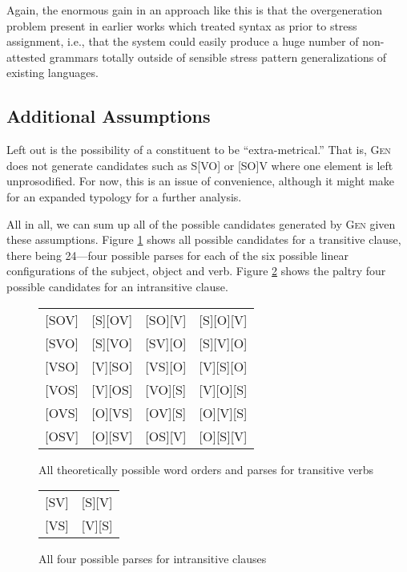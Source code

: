 \documentclass{article}
\begin{document}
Again, the enormous gain in an approach like this is that the overgeneration problem present in earlier works which treated syntax as prior to stress assignment, i.e., that the \textcite{halle87} system could easily produce a huge number of non-attested grammars totally outside of sensible stress pattern generalizations of existing languages.

\subsection{Additional Assumptions\label{assump}}

Left out is the possibility of a constituent to be ``extra-metrical.''
That is, \textsc{Gen} does not generate candidates such as S[VO] or [SO]V where one element is left unprosodified.
For now, this is an issue of convenience, although it might make for an expanded typology for a further analysis.

All in all, we can sum up all of the possible candidates generated by \textsc{Gen} given these assumptions.
Figure \ref{allcand} shows all possible candidates for a transitive clause, there being 24---four possible parses for each of the six possible linear configurations of the subject, object and verb.
Figure \ref{instrans} shows the paltry four possible candidates for an intransitive clause.

\begin{figure}
	\begin{center}
	\begin{tabular}{cccc}
		{}[SOV]&[S][OV]&[SO][V]&[S][O][V]\\
		{}[SVO]&[S][VO]&[SV][O]&[S][V][O]\\
		{}[VSO]&[V][SO]&[VS][O]&[V][S][O]\\
		{}[VOS]&[V][OS]&[VO][S]&[V][O][S]\\
		{}[OVS]&[O][VS]&[OV][S]&[O][V][S]\\
		{}[OSV]&[O][SV]&[OS][V]&[O][S][V]\\
	\end{tabular}
	\end{center}
	\caption{All theoretically possible word orders and parses for transitive verbs\label{allcand}}
\end{figure}

\begin{figure}
	\begin{center}
		\begin{tabular}{cc}
			{}[SV]&[S][V]\\
			{}[VS]&[V][S]\\
		\end{tabular}
	\end{center}
	\caption{All four possible parses for intransitive clauses\label{instrans}}
\end{figure}
\end{document}
